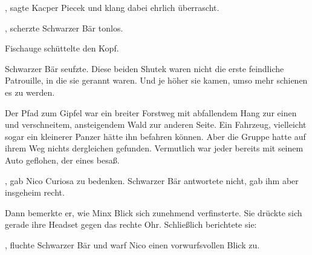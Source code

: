 \par

, sagte Kacper Piecek und klang dabei ehrlich überrascht. 

\par

, scherzte Schwarzer Bär tonlos. 

\par

Fischauge schüttelte den Kopf. 

\par

Schwarzer Bär seufzte. Diese beiden Shutek waren nicht die erste feindliche Patrouille, in die sie gerannt waren. Und je höher sie kamen, umso mehr schienen es zu werden.

\par

Der Pfad zum Gipfel war ein breiter Forstweg mit abfallendem Hang zur einen und verschneitem, ansteigendem Wald zur anderen Seite. Ein Fahrzeug, vielleicht sogar ein kleinerer Panzer hätte ihn befahren können. Aber die Gruppe hatte auf ihrem Weg nichts dergleichen gefunden. Vermutlich war jeder bereits mit seinem Auto geflohen, der eines besaß.

\par

, gab Nico Curiosa zu bedenken. Schwarzer Bär antwortete nicht, gab ihm aber insgeheim recht.

\par

Dann bemerkte er, wie Minx Blick sich zunehmend verfinsterte. Sie drückte sich gerade ihre Headset gegen das rechte Ohr. Schließlich berichtete sie: 

\par

, fluchte Schwarzer Bär und warf Nico einen vorwurfsvollen Blick zu. 

